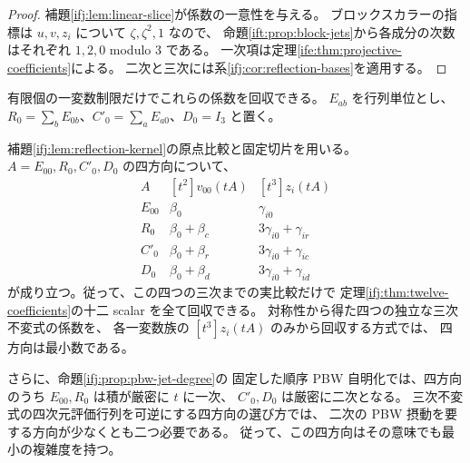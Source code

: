\begin{proof}
補題\ref{ifj:lem:linear-slice}が係数の一意性を与える。
ブロックスカラーの指標は $u,v,z_i$ について $\zeta,\zeta^2,1$ なので、
命題\ref{ift:prop:block-jets}から各成分の次数はそれぞれ $1,2,0$ modulo $3$ である。
一次項は定理\ref{ife:thm:projective-coefficients}による。
二次と三次には系\ref{ifj:cor:reflection-bases}を適用する。
\end{proof}

有限個の一変数制限だけでこれらの係数を回収できる。
$E_{ab}$ を行列単位とし、
$R_0=\sum_b E_{0b}$、$C'_0=\sum_a E_{a0}$、$D_0=I_3$ と置く。

\begin{proposition}
\label{ifj:prop:minimal-probes}
補題\ref{ifj:lem:reflection-kernel}の原点比較と固定切片を用いる。
$A=E_{00},R_0,C'_0,D_0$ の四方向について、
\begin{equation}\label{ifj:eq:probe-table}
 \begin{array}{c|c|c}
 A &[t^2]v_{00}(tA)&[t^3]z_i(tA)\\ \hline
 E_{00}&\beta_0&\gamma_{i0}\\
 R_0&\beta_0+\beta_c&3\gamma_{i0}+\gamma_{ir}\\
 C'_0&\beta_0+\beta_r&3\gamma_{i0}+\gamma_{ic}\\
 D_0&\beta_0+\beta_d&3\gamma_{i0}+\gamma_{id}
 \end{array}
\end{equation}
が成り立つ。従って、この四つの三次までの実比較だけで
定理\ref{ifj:thm:twelve-coefficients}の十二 scalar を全て回収できる。
対称性から得た四つの独立な三次不変式の係数を、
各一変数族の $[t^3]z_i(tA)$ のみから回収する方式では、
四方向は最小数である。

さらに、命題\ref{ifj:prop:pbw-jet-degree}の
固定した順序 PBW 自明化では、四方向のうち
$E_{00},R_0$ は積が厳密に $t$ に一次、
$C'_0,D_0$ は厳密に二次となる。
三次不変式の四次元評価行列を可逆にする四方向の選び方では、
二次の PBW 摂動を要する方向が少なくとも二つ必要である。
従って、この四方向はその意味でも最小の複雑度を持つ。
\end{proposition}

